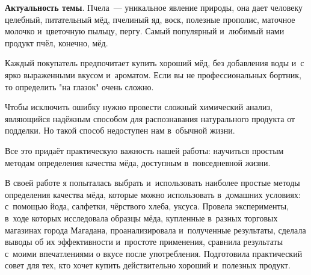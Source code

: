 \textbf{Актуальность темы}. Пчела~--- уникальное явление природы, она дает человеку целебный, питательный мёд, пчелиный яд, воск, полезные прополис, маточное молочко и~цветочную пыльцу, пергу. Самый популярный и~любимый нами продукт пчёл, конечно, мёд.

Каждый покупатель предпочитает купить хороший мёд, без добавления воды и~с ярко выраженными вкусом и~ароматом. Если вы не профессиональных бортник, то определить "на глазок" очень сложно.

Чтобы исключить ошибку нужно провести сложный химический анализ, являющийся надёжным способом для распознавания натурального продукта от подделки. Но такой способ недоступен нам в~обычной жизни.

Все это придаёт практическую важность нашей работы: научиться простым методам определения качества мёда, доступным в~повседневной жизни.

В своей работе я попыталась выбрать и~использовать наиболее простые методы определения качества мёда, которые можно использовать в~домашних условиях: с~помощью йода, салфетки, чёрствого хлеба, уксуса. Провела эксперименты, в~ходе которых исследовала образцы мёда, купленные в~разных торговых магазинах города Магадана, проанализировала и~полученные результаты, сделала выводы об их эффективности и~простоте применения, сравнила результаты с~моими впечатлениями о вкусе после употребления. Подготовила практический совет для тех, кто хочет купить действительно хороший и~полезных продукт.
